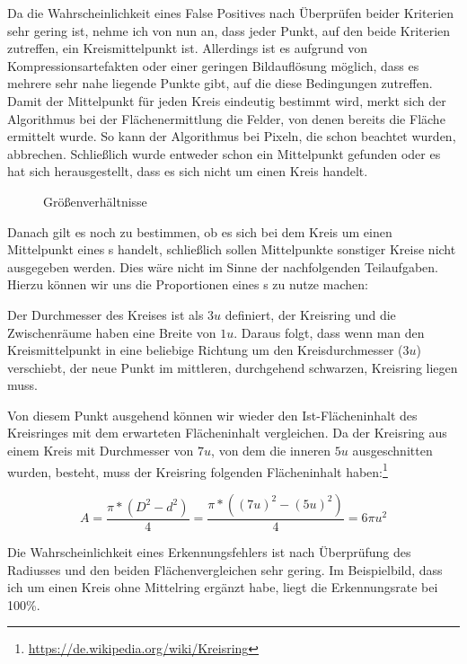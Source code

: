 Da die Wahrscheinlichkeit eines False Positives nach Überprüfen beider Kriterien sehr gering ist, nehme ich von nun an, dass jeder Punkt, auf den beide Kriterien zutreffen, ein Kreismittelpunkt ist. Allerdings ist es aufgrund von Kompressionsartefakten oder einer geringen Bildauflösung möglich, dass es mehrere sehr nahe liegende Punkte gibt, auf die diese Bedingungen zutreffen. Damit der Mittelpunkt für jeden Kreis eindeutig bestimmt wird, merkt sich der Algorithmus bei der Flächenermittlung die Felder, von denen bereits die Fläche ermittelt wurde. So kann der Algorithmus bei Pixeln, die schon beachtet wurden, abbrechen. Schließlich wurde entweder schon ein Mittelpunkt gefunden oder es hat sich herausgestellt, dass es sich nicht um einen Kreis handelt.

\begin{figure}
  \centering
  
  \caption{Größenverhältnisse}
  \label{abb:dims}
\end{figure}
Danach gilt es noch zu bestimmen, ob es sich bei dem Kreis um einen Mittelpunkt eines \task{}s handelt, schließlich sollen Mittelpunkte sonstiger Kreise nicht ausgegeben werden. Dies wäre nicht im Sinne der nachfolgenden Teilaufgaben. Hierzu können wir uns die Proportionen eines \task{}s zu nutze machen:

Der Durchmesser des Kreises ist als \(3u\) definiert, der Kreisring und die Zwischenräume haben eine Breite von \(1u\). Daraus folgt, dass wenn man den Kreismittelpunkt in eine beliebige Richtung um den Kreisdurchmesser (\(3u\)) verschiebt, der neue Punkt im mittleren, durchgehend schwarzen, Kreisring liegen muss.

Von diesem Punkt ausgehend können wir wieder den Ist-Flächeninhalt des Kreisringes mit dem erwarteten Flächeninhalt vergleichen. Da der Kreisring aus einem Kreis mit Durchmesser von \(7u\), von dem die inneren \(5u\) ausgeschnitten wurden, besteht, muss der Kreisring folgenden Flächeninhalt haben:\footnote{\url{https://de.wikipedia.org/wiki/Kreisring}}

\begin{equation}
	A=\frac{\pi{}*(D^2-d^2)}{4}=\frac{\pi{}*((7u)^2-(5u)^2)}{4}=6\pi{}u^2
\end{equation}

Die Wahrscheinlichkeit eines Erkennungsfehlers ist nach Überprüfung des Radiusses und den beiden Flächenvergleichen sehr gering. Im Beispielbild, dass ich um einen Kreis ohne Mittelring ergänzt habe, liegt die Erkennungsrate bei 100\%.

